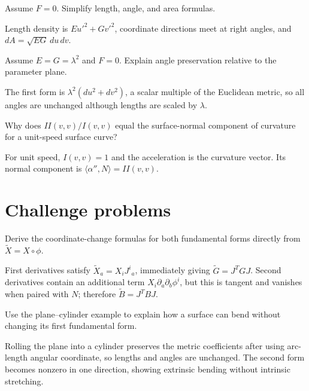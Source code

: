 \begin{problem}\label{prob:vii15-10}
Assume \(F=0\). Simplify length, angle, and area formulas.
\end{problem}
\begin{solution}
Length density is \(Eu'^2+Gv'^2\), coordinate directions meet at right angles, and \(dA=\sqrt{EG}\,du\,dv\).
\end{solution}

\begin{problem}\label{prob:vii15-11}
Assume \(E=G=\lambda^2\) and \(F=0\). Explain angle preservation relative to the parameter plane.
\end{problem}
\begin{solution}
The first form is \(\lambda^2(du^2+dv^2)\), a scalar multiple of the Euclidean metric, so all angles are unchanged although lengths are scaled by \(\lambda\).
\end{solution}

\begin{problem}\label{prob:vii15-12}
Why does \(II(v,v)/I(v,v)\) equal the surface-normal component of curvature for a unit-speed surface curve?
\end{problem}
\begin{solution}
For unit speed, \(I(v,v)=1\) and the acceleration is the curvature vector. Its normal component is \(\langle\alpha'',N\rangle=II(v,v)\).
\end{solution}

\section{Challenge problems}
\begin{problem}\label{prob:vii15-ch01}
Derive the coordinate-change formulas for both fundamental forms directly from \(\widetilde X=X\circ\phi\).
\end{problem}
\begin{solution}
First derivatives satisfy \(\widetilde X_a=X_iJ^i{}_a\), immediately giving \(\widetilde G=J^TGJ\). Second derivatives contain an additional term \(X_i\partial_a\partial_b\phi^i\), but this is tangent and vanishes when paired with \(N\); therefore \(\widetilde B=J^TBJ\).
\end{solution}

\begin{problem}\label{prob:vii15-ch02}
Use the plane--cylinder example to explain how a surface can bend without changing its first fundamental form.
\end{problem}
\begin{solution}
Rolling the plane into a cylinder preserves the metric coefficients after using arc-length angular coordinate, so lengths and angles are unchanged. The second form becomes nonzero in one direction, showing extrinsic bending without intrinsic stretching.
\end{solution}

